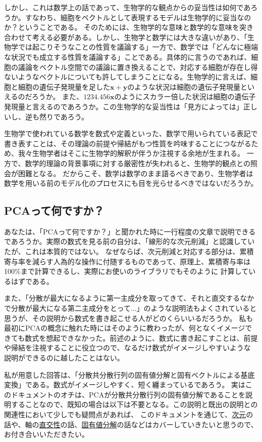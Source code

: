 \documentclass[10pt]{ujarticle}
\begin{document}
しかし、これは数学上の話であって、生物学的な観点からの妥当性は如何であろうか。すなわち、細胞をベクトルとして表現するモデルは生物学的に妥当なのか？ということである。
そのためには、生物学的な意味と数学的な意味を突き合わせて考える必要がある。しかし、生物学と数学には大きな違いがあり、「生物学では起こりそうなことの性質を議論する」一方で、数学では「どんなに極端な状況でも成立する性質を議論する」ことである。具体的に言うのであれば、細胞の議論をベクトル空間での議論に置き換えることで、対応する細胞が存在し得ないようなベクトルについても許してしまうことになる。生物学的に言えば、細胞と細胞の遺伝子発現量を足した$\mathbf{x+y}$のような状況は細胞の遺伝子発現量といえるのだろうか。
また、$1234.456\mathbf{x}$のようにスカラー倍した状況は細胞の遺伝子発現量と言えるのであろうか。この生物学的な妥当性は「見方によっては」正しいし、逆も然りであろう。

生物学で使われている数学を数式や定義といった、数学で用いられている表記で書き表すことは、その理論の前提や帰結がもつ性質を吟味することにつながるため、我々生物学者はそこに生物学的解釈が伴うか注視する余地が生まれる。
一方で、数学的理論の背景事項に対する厳密性が失われると、生物学的観点との照会が困難となる。
だからこそ、数学は数学のまま語るべきであり、生物学者は数学を用いる前のモデル化のプロセスにも目を光らせるべきではないだろうか。

\subsection{PCAって何ですか？}
あなたは、「PCAって何ですか？」と聞かれた時に一行程度の文章で説明できるであろうか。実際の数式を見る前の自分は、「線形的な次元削減」と認識していたが、これは本質的ではない。
なぜならば、次元削減と対応する部分は、累積寄与率を減らす人為的な操作に付随するものであって、原理上、累積寄与率は100\%まで計算できるし、実際にお使いのライブラリでもそのように
計算しているはずである。

また、「分散が最大になるように第一主成分を取ってきて、それと直交するなかで分散が最大になる第二主成分をとって...」のような説明法もよくされていると思うが、その説明から数式を書き起こせる人がどのくらいいるだろうか。
私も最初にPCAの概念に触れた時にはそのように教わったが、何となくイメージできても数式を想起できなかった。前述のように、数式に書き起こすことは、前提や帰結を注視することに役立つので、なるだけ数式がイメージしやすいような
説明ができるのに越したことはない。

私が用意した回答は、「分散共分散行列の固有値分解と固有ベクトルによる基底変換」である。数式がイメージしやすく、短く纏まっているであろう。
実はこのドキュメントのオチは、PCAが分散共分散行列の固有値分解であることを説明することなので、既知の場合は以下は不要となる。この説明と既出の説明との関連性において少しでも疑問点があれば、
このドキュメントを通じて、\hyperlink{bases_and_dim}{次元}の話や、軸の\hyperlink{innerprod}{直交性}の話、\hyperlink{eigen}{固有値分解}の話などはカバーしていきたいと思うので、お付き合いいただきたい。
\end{document}
